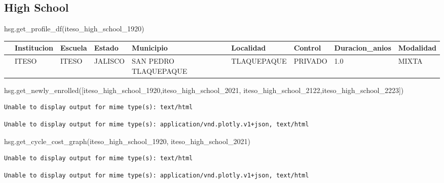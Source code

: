 \documentclass[
  letterpaper,
  DIV=11,
  numbers=noendperiod]{scrartcl}
\newenvironment{Shaded}{\begin{snugshade}}{\end{snugshade}}
\newcommand{\NormalTok}[1]{\textcolor[rgb]{0.00,0.23,0.31}{#1}}
\begin{document}
\subsection{High School}\label{high-school}

\begin{Shaded}
\begin{Highlighting}[]
\NormalTok{hsg.get\_profile\_df(iteso\_high\_school\_1920)}
\end{Highlighting}
\end{Shaded}

\begin{longtable}[]{@{}lllllllll@{}}
\toprule\noalign{}
& Institucion & Escuela & Estado & Municipio & Localidad & Control &
Duracion\_anios & Modalidad \\
\midrule\noalign{}
\endhead
\bottomrule\noalign{}
\endlastfoot
14858 & ITESO & ITESO & JALISCO & SAN PEDRO TLAQUEPAQUE & TLAQUEPAQUE &
PRIVADO & 1.0 & MIXTA \\
\end{longtable}

\begin{Shaded}
\begin{Highlighting}[]
\NormalTok{hsg.get\_newly\_enrolled([iteso\_high\_school\_1920,iteso\_high\_school\_2021, }
\NormalTok{                        iteso\_high\_school\_2122,iteso\_high\_school\_2223])}
\end{Highlighting}
\end{Shaded}

\begin{verbatim}
Unable to display output for mime type(s): text/html
\end{verbatim}

\begin{verbatim}
Unable to display output for mime type(s): application/vnd.plotly.v1+json, text/html
\end{verbatim}

\begin{Shaded}
\begin{Highlighting}[]
\NormalTok{hsg.get\_cycle\_cost\_graph(iteso\_high\_school\_1920, iteso\_high\_school\_2021)}
\end{Highlighting}
\end{Shaded}

\begin{verbatim}
Unable to display output for mime type(s): text/html
\end{verbatim}

\begin{verbatim}
Unable to display output for mime type(s): application/vnd.plotly.v1+json, text/html
\end{verbatim}
\end{document}
